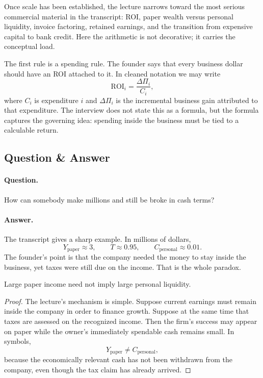 Once scale has been established, the lecture narrows toward the most serious commercial material in the transcript: ROI, paper wealth versus personal liquidity, invoice factoring, retained earnings, and the transition from expensive capital to bank credit. Here the arithmetic is not decorative; it carries the conceptual load.

The first rule is a spending rule. The founder says that every business dollar should have an ROI attached to it. In cleaned notation we may write
\begin{equation}
\mathrm{ROI}_i=\frac{\Delta \Pi_i}{C_i},
\end{equation}
where \(C_i\) is expenditure \(i\) and \(\Delta \Pi_i\) is the incremental business gain attributed to that expenditure. The interview does not state this as a formula, but the formula captures the governing idea: spending inside the business must be tied to a calculable return.

\subsection{Question \& Answer}

\paragraph{Question.} How can somebody make millions and still be broke in cash terms?

\paragraph{Answer.} The transcript gives a sharp example. In millions of dollars,
\begin{equation}
Y_{\text{paper}} \approx 3,\qquad T \approx 0.95,\qquad C_{\text{personal}} \approx 0.01.
\end{equation}
The founder's point is that the company needed the money to stay inside the business, yet taxes were still due on the income. That is the whole paradox.

\begin{proposition}
Large paper income need not imply large personal liquidity.
\end{proposition}

\begin{proof}
The lecture's mechanism is simple. Suppose current earnings must remain inside the company in order to finance growth. Suppose at the same time that taxes are assessed on the recognized income. Then the firm's success may appear on paper while the owner's immediately spendable cash remains small. In symbols,
\[
Y_{\text{paper}} \neq C_{\text{personal}},
\]
because the economically relevant cash has not been withdrawn from the company, even though the tax claim has already arrived.
\end{proof}

